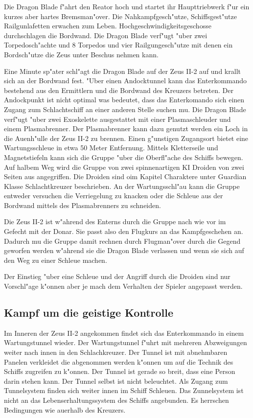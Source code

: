 Die Dragon Blade f"ahrt den Reator hoch und startet ihr Haupttriebwerk f"ur ein kurzes aber hartes Bremsman"over. Die Nahkampfgesch"utze, Schiffsgest"utze Railgunlafetten erwachen zum Leben. Hochgeschwindigkeitsgeschosse durchschlagen die Bordwand. Die Dragon Blade verf"ugt "uber zwei Torpedosch"achte und 8 Torpedos und vier Railgungesch"utze mit denen ein Bordsch"utze die Zeus unter Beschus\3 nehmen kann. 

Eine Minute sp"ater schl"agt die Dragon Blade auf der Zeus II-2 auf und krallt sich an der Bordwand fest. "Uber einen Andocktunnel kann das Enterkommando bestehend aus den Ermittlern und \xl{} die Bordwand des Kreuzers betreten. Der Andockpunkt ist nicht optimal was bedeutet, dass das Enterkomando sich einen Zugang zum Schlachtschiff an einer anderen Stelle suchen mu\3. Die Dragon Blade verf"ugt "uber zwei Exoskelette ausgestattet mit einer Plasmaschleuder und einem Plasmabrenner. Der Plasmabrenner kann dazu genutzt werden ein Loch in die Au\3enh"ulle der Zeus II-2 zu brennen. Einen g"unstigen Zugangsort bietet eine Wartungsschleu\3e in etwa 50 Meter Entfernung. Mittels Kletterseile und Magnetstiefeln kann sich die Gruppe "uber die Oberfl"ache des Schiffs bewegen. Auf halbem Weg wird die Gruppe von zwei spinnenartigen KI Droiden von zwei Seiten aus angegriffen. Die Droiden sind oim Kapitel Charaktere unter Guardian Klasse Schlachtkreuzer beschrieben. An der Wartungsschl"au\3 kann die Gruppe entweder versuchen die Verriegelung zu knacken oder die Schleu\3e aus der Bordwand mittels des Plasmabrenners zu schneiden.

\begin{remarks}
	Die Zeus II-2 ist w"ahrend des Enterns durch die Gruppe nach wie vor im Gefecht mit der Donar. Sie passt also den Flugkurs an das Kampfgeschehen an. Dadurch mu\3 die Gruppe damit rechnen durch Flugman"over durch die Gegend geworfen werden w"ahrend sie die Dragon Blade verlassen und wenn sie sich auf den Weg zu einer Schleu\3e machen.

	Der Einstieg "uber eine Schleu\3e und der Angriff durch die Droiden sind nur Vorschl"age k"onnen aber je mach dem Verhalten der Spieler angepasst werden.
\end{remarks}

\subsection{Kampf um die geistige Kontrolle}
Im Inneren der Zeus II-2 angekommen findet sich das Enterkommando in einem Wartungstunnel wieder. Der Wartungstunnel f"uhrt mit mehreren Abzweigungen weiter nach innen in den Schlachkreuzer. Der Tunnel ist mit abnehmbaren Panelen verkleidet die abgenommen werden k"onnen um auf die Technik des Schiffs zugreifen zu k"onnen. Der Tunnel ist gerade so breit, dass eine Person darin stehen kann. Der Tunnel selbst ist nicht beleuchtet. Als Zugang zum Tunnelsystem finden sich weiter innen im Schiff Schleu\3en. Das Zunnelsystem ist nicht an das Lebenserhaltungssystem des Schiffs angebunden. Es herrschen Bedingungen wie au\3erhalb des Kreuzers.


